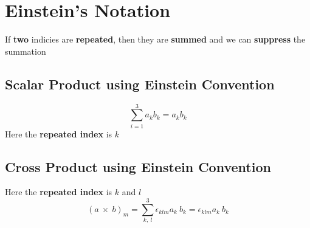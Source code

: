 \section{Einstein's Notation}

\begin{definition}

	If {\bf two} indicies are {\bf repeated}, then they are {\bf summed} and we can {\bf suppress} the summation
\end{definition}

\subsection{Scalar Product using Einstein Convention}
\begin{eg}
	$$\sum_{i=1}^{3}a_{k}b_{k} = a_{k}b_{k}$$
	Here the {\bf repeated index} is $k$
\end{eg}

\subsection{Cross Product using Einstein Convention}
\begin{eg}
	Here the {\bf repeated index} is $k$ and $l$
	$$(a \ \times\ b)_{m}= \sum\limits_{k,\  l}^{3}\epsilon_{klm}a_{k}\ b_k =\epsilon_{klm} a_{k} \ b_{k}$$

\end{eg}

